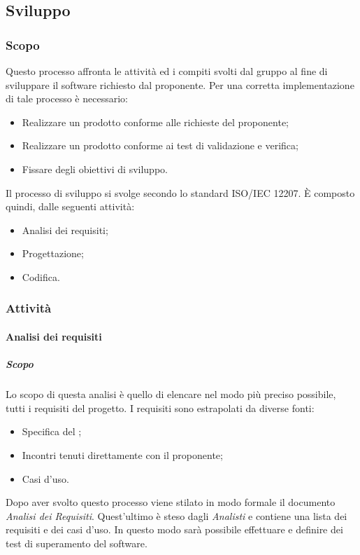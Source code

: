 \subsection{Sviluppo}
	\subsubsection{Scopo}
	Questo processo affronta le attività ed i compiti svolti dal gruppo al fine di sviluppare il software richiesto dal proponente. Per una corretta implementazione di tale processo è necessario:
	\begin{itemize}
		\item Realizzare un prodotto conforme alle richieste del proponente;
		\item Realizzare un prodotto conforme ai test di validazione e verifica;
		\item Fissare degli obiettivi di sviluppo.
	\end{itemize}
     Il processo di sviluppo si svolge secondo lo standard ISO/IEC 12207. È composto quindi, dalle seguenti attività:
     	\begin{itemize}
     	\item Analisi dei requisiti;
     	\item Progettazione;
     	\item Codifica.
     \end{itemize}
     
	

	\subsubsection{Attività}
		\paragraph{Analisi dei requisiti}
			\subparagraph{Scopo} \Spazio
			Lo scopo di questa analisi è quello di elencare nel modo più preciso possibile, tutti i requisiti del progetto. 
			I requisiti sono estrapolati da diverse fonti:
				\begin{itemize}
				\item Specifica del ;
				\item Incontri tenuti direttamente con il proponente;
				\item Casi d'uso.
			\end{itemize}
		    Dopo aver svolto questo processo viene stilato in modo formale il documento \textit{Analisi dei Requisiti}.
		    Quest'ultimo è steso dagli \emph{Analisti} e contiene una lista dei requisiti e dei casi d'uso.
		    In questo modo sarà possibile effettuare e definire dei test di superamento del software. 

